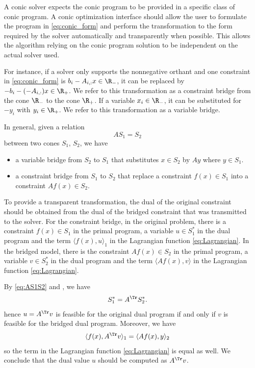 \documentclass[11pt,twoside,a4paper,openright]{uclouvain-thesis}
\begin{document}
A conic solver expects the conic program to be provided in a specific class
of conic program.
A conic optimization interface should allow the user to formulate the program
in \eqref{eq:conic_form} and perform the transformation to the form required
by the solver automatically and transparently when possible.
This allows the algorithm relying on the conic program solution to be independent
on the actual solver used.

For instance, if a solver only supports the nonnegative orthant and
one constraint in \eqref{eq:conic_form} is $b_i - A_{i,:} x \in \R_-$,
it can be replaced by $-b_i - (-A_{i,:}) x \in \R_+$.
We refer to this transformation as a constraint bridge from the cone $\R_-$ to the cone $\R_+$.
If a variable $x_i \in \R_-$, it can be substituted for $-y_i$ with $y_i \in \R_+$.
We refer to this transformation as a variable bridge.

In general, given a relation
\begin{equation}
  \label{eq:AS1S2}
  AS_1 = S_2
\end{equation}
between two cones $S_1$, $S_2$, we have
\begin{itemize}
  \item a variable bridge from $S_2$ to $S_1$ that substitutes
    $x \in S_2$ by $Ay$ where $y \in S_1$.
  \item a constraint bridge from $S_1$ to $S_2$ that replace
    a constraint $f(x) \in S_1$ into a constraint $Af(x) \in S_2$.
\end{itemize}

To provide a transparent transformation, the dual of the original
constraint should be obtained from the dual of the bridged constraint
that was transmitted to the solver.
For the constraint bridge, in the original problem, there is a constraint
$f(x) \in S_1$ in the primal program, a variable $u \in S_1^*$ in the dual program
and the term $\langle f(x), u \rangle_1$ in the Lagrangian function \eqref{eq:Lagrangian}.
In the bridged model, there is the constraint $Af(x) \in S_2$ in the primal program,
a variable $v \in S_2^*$ in the dual program and the term
$\langle Af(x), v \rangle$ in the Lagrangian function \eqref{eq:Lagrangian}.

By \eqref{eq:AS1S2} and , we have
\begin{equation}
  \label{eq:S1AS2}
  S_1^* = A^\Tr S_2^*.
\end{equation}
hence $u = A^\Tr v$ is feasible for the original dual program if and only
if $v$ is feasible for the bridged dual program.
Moreover, we have
\[ \langle f(x), A^\Tr v \rangle_1 = \langle A f(x), y \rangle_2 \]
so the term in the Lagrangian function \eqref{eq:Lagrangian} is equal as well.
We conclude that the dual value $u$ should be computed as $A^\Tr v$.
\end{document}
